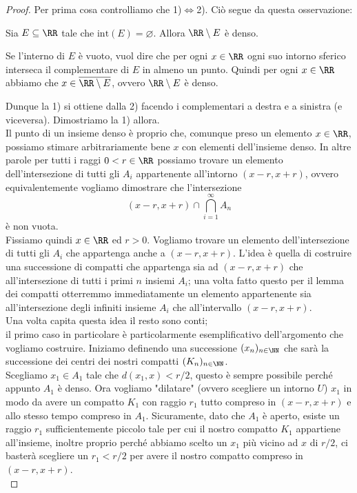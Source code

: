 \documentclass[11pt]{scrartcl}
\newcommand{\eset}{\varnothing}
\begin{document}
 	\begin{proof}
 		Per prima cosa controlliamo che 1)$\iff$2). Ciò segue da questa osservazione:
 		\begin{claim}
 			Sia $E\subseteq\RR$ tale che $\text{int}(E)=\eset$. Allora $\RR\setminus E$ è denso.
 		\end{claim}
 		\begin{subproof}
 			Se l'interno di $E$ è vuoto, vuol dire che per ogni $x\in\RR$ ogni suo intorno sferico interseca il complementare di $E$ in almeno un punto. Quindi per ogni $x\in\RR$ abbiamo che $x\in\overline{\RR\setminus E}$, ovvero $\RR\setminus E$ è denso.
 		\end{subproof}
 		Dunque la 1) si ottiene dalla 2) facendo i complementari a destra e a sinistra (e viceversa). Dimostriamo la 1) allora. \\
 		Il punto di un insieme denso è proprio che, comunque preso un elemento $x\in\RR$, possiamo stimare arbitrariamente bene $x$ con elementi dell'insieme denso. In altre parole per tutti i raggi $0<r\in\RR$ possiamo trovare un elemento dell'intersezione di tutti gli $A_i$ appartenente all'intorno $(x-r,x+r)$, ovvero equivalentemente vogliamo dimostrare che l'intersezione 
 		$$(x-r,x+r)\cap\bigcap_{i=1}^\infty A_n$$ 
 		è non vuota.\\
 		Fissiamo quindi $x\in\RR$ ed $r>0$. Vogliamo trovare un elemento dell'intersezione di tutti gli $A_i$ che appartenga anche a $(x-r,x+r)$.
 		L'idea è quella di costruire una successione di compatti che appartenga sia ad $(x-r,x+r)$ che all'intersezione di tutti i primi $n$ insiemi $A_i$; una volta fatto questo per il lemma dei compatti otterremmo immediatamente un elemento appartenente sia all'intersezione degli infiniti insieme $A_i$ che all'intervallo $(x-r,x+r)$. \\
 		Una volta capita questa idea il resto sono conti; \\
 		il primo caso in particolare è particolarmente esemplificativo dell'argomento che vogliamo costruire. Iniziamo definendo una successione $(x_n)_{n\in\NN}$ che sarà la successione dei centri dei nostri compatti $(K_n)_{n\in\NN}$. \\
 		Scegliamo $x_1\in A_1$ tale che $d(x_1,x)<r/2$, questo è sempre possibile perché appunto $A_1$ è denso. Ora  vogliamo "dilatare" (ovvero scegliere un intorno $U$) $x_1$ in modo da avere un compatto $K_1$ con raggio $r_1$ tutto compreso in $(x-r,x+r)$ e allo stesso tempo compreso in $A_1$. Sicuramente, dato che $A_1$ è aperto, esiste un raggio $r_1$ sufficientemente piccolo tale per cui il nostro compatto $K_1$ appartiene all'insieme, inoltre proprio perché abbiamo scelto un $x_1$ più vicino ad $x$ di $r/2$, ci basterà scegliere un $r_1<r/2$ per avere il nostro compatto compreso in $(x-r,x+r)$. \\

\end{proof}
\end{document}
